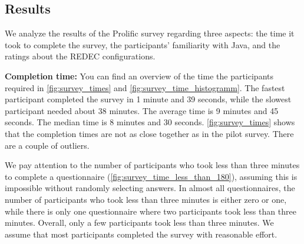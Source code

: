 \documentclass[%
class=scrreprt,
chapterprefix=false,%
open=right,%
twoside=true,%
paper=a4,%
logofile={Logo\_zentral\_farbig\_EN.png},%
thesistype=master,%
UKenglish,%
]{se2thesis}
\theoremstyle{definition}
\newcommand{\rdh}{REDEC\xspace}
\begin{document}
\subsection{Results}
	We analyze the results of the Prolific survey regarding three aspects: the time it took to complete the survey, the participants' familiarity with Java, and the ratings about the \rdh configurations.

	\textbf{Completion time:}
    You can find an overview of the time the participants required in \autoref{fig:survey_times} and \autoref{fig:survey_time_histogramm}.
    The fastest participant completed the survey in 1 minute and 39 seconds, while the slowest participant needed about 38 minutes. 
    The average time is 9 minutes and 45 seconds. The median time is 8 minutes and 30 seconds. \autoref{fig:survey_times} shows that the completion times are not as close together as in the pilot survey. There are a couple of outliers.
	
	We pay attention to the number of participants who took less than three minutes to complete a questionnaire (\autoref{fig:survey_time_less_than_180}), assuming this is impossible without randomly selecting answers. In almost all questionnaires, the number of participants who took less than three minutes is either zero or one, while there is only one questionnaire where two participants took less than three minutes.
    Overall, only a few participants took less than three minutes. We assume that most participants completed the survey with reasonable effort.
		
\end{document}
